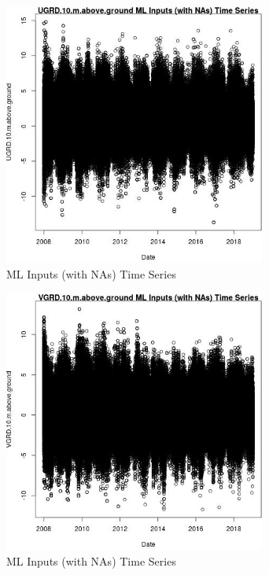 \begin{figure} 
\centering  
\includegraphics[width=0.77\textwidth]{Code_Outputs/Report_ML_input_PM25_Step4_part_f_de_duplicated_aves_prioritize_24hr_obswNAs_UGRD10mabovegroundvDate.jpg} 
\caption{\label{fig:Report_ML_input_PM25_Step4_part_f_de_duplicated_aves_prioritize_24hr_obswNAsUGRD10mabovegroundvDate}ML Inputs (with NAs) Time Series} 
\end{figure} 
 

\begin{figure} 
\centering  
\includegraphics[width=0.77\textwidth]{Code_Outputs/Report_ML_input_PM25_Step4_part_f_de_duplicated_aves_prioritize_24hr_obswNAs_VGRD10mabovegroundvDate.jpg} 
\caption{\label{fig:Report_ML_input_PM25_Step4_part_f_de_duplicated_aves_prioritize_24hr_obswNAsVGRD10mabovegroundvDate}ML Inputs (with NAs) Time Series} 
\end{figure} 
 

